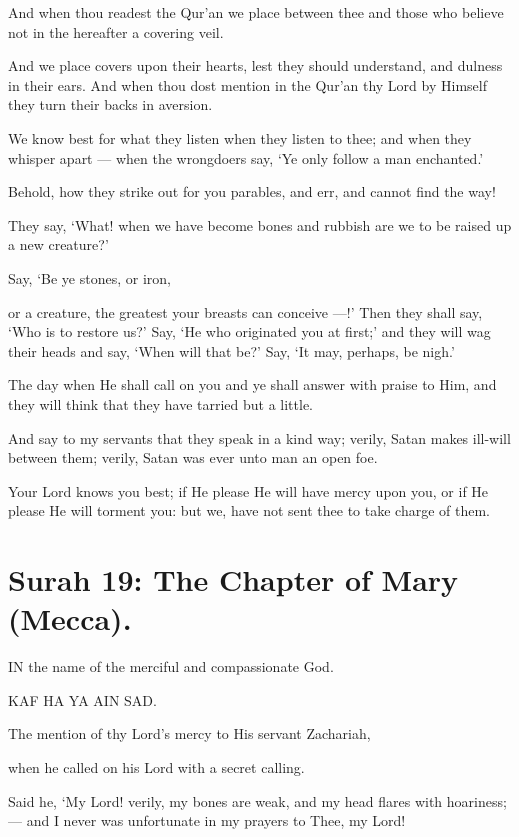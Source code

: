 \documentclass[fontsize=14pt, letterpaper, notitlepage, openany, DIV=12]{scrbook} %
\begin{document}
\noindent[17:45]
And when thou readest the Qur'an we place between thee and those who believe not in
the hereafter a covering veil.

\noindent[17:46]
And we place covers upon their hearts, lest they should understand, and dulness in their
ears. And when thou dost mention in the Qur'an thy Lord by Himself they turn their backs in
aversion.

\noindent[17:47]
We know best for what they listen when they listen to thee; and when they whisper apart
--- when the wrongdoers say, `Ye only follow a man enchanted.'

\noindent[17:48]
Behold, how they strike out for you parables, and err, and cannot find the way!

\noindent[17:49]
They say, `What! when we have become bones and rubbish are we to be raised up a new
creature?'

\noindent[17:50]
Say, `Be ye stones, or iron,

\noindent[17:51]
or a creature, the greatest your breasts can conceive ---!' Then they shall say, `Who is to
restore us?' Say, `He who originated you at first;' and they will wag their heads and say, `When
will that be?' Say, `It may, perhaps, be nigh.'

\noindent[17:52]
The day when He shall call on you and ye shall answer with praise to Him, and they will
think that they have tarried but a little.

\noindent[17:53]
And say to my servants that they speak in a kind way; verily, Satan makes ill-will
between them; verily, Satan was ever unto man an open foe.

\noindent[17:54]
Your Lord knows you best; if He please He will have mercy upon you, or if He please He
will torment you: but we, have not sent thee to take charge of them.


\section{Surah 19: The Chapter of Mary (Mecca).}


IN the name of the merciful and compassionate God.

\noindent[19:1]
KAF HA YA AIN SAD.

\noindent[19:2]
The mention of thy Lord's mercy to His servant Zachariah,

\noindent[19:3]
when he called on his Lord with a secret calling.

\noindent[19:4]
Said he, `My Lord! verily, my bones are weak, and my head flares with hoariness; --- and
I never was unfortunate in my prayers to Thee, my Lord!
\end{document}
